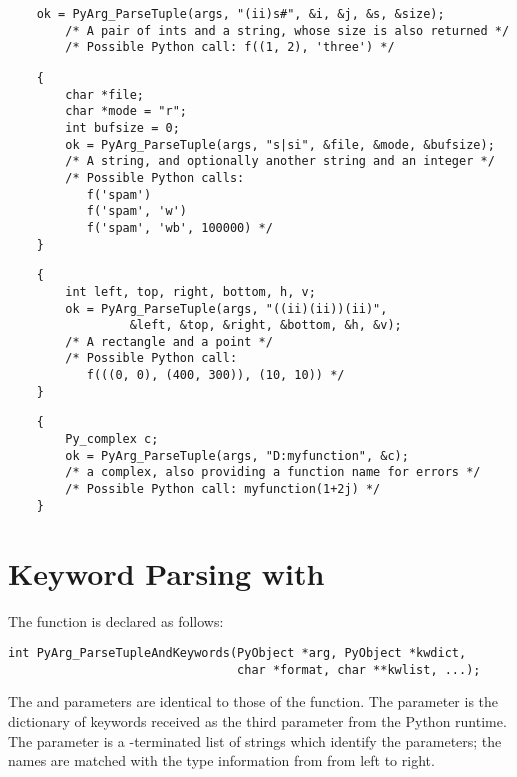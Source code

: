 \documentclass{manual}
\begin{document}
\begin{verbatim}
    ok = PyArg_ParseTuple(args, "(ii)s#", &i, &j, &s, &size);
        /* A pair of ints and a string, whose size is also returned */
        /* Possible Python call: f((1, 2), 'three') */
\end{verbatim}

\begin{verbatim}
    {
        char *file;
        char *mode = "r";
        int bufsize = 0;
        ok = PyArg_ParseTuple(args, "s|si", &file, &mode, &bufsize);
        /* A string, and optionally another string and an integer */
        /* Possible Python calls:
           f('spam')
           f('spam', 'w')
           f('spam', 'wb', 100000) */
    }
\end{verbatim}

\begin{verbatim}
    {
        int left, top, right, bottom, h, v;
        ok = PyArg_ParseTuple(args, "((ii)(ii))(ii)",
                 &left, &top, &right, &bottom, &h, &v);
        /* A rectangle and a point */
        /* Possible Python call:
           f(((0, 0), (400, 300)), (10, 10)) */
    }
\end{verbatim}

\begin{verbatim}
    {
        Py_complex c;
        ok = PyArg_ParseTuple(args, "D:myfunction", &c);
        /* a complex, also providing a function name for errors */
        /* Possible Python call: myfunction(1+2j) */
    }
\end{verbatim}


\section{Keyword Parsing with 
         \label{parseTupleAndKeywords}}

The  function is declared as
follows:

\begin{verbatim}
int PyArg_ParseTupleAndKeywords(PyObject *arg, PyObject *kwdict,
                                char *format, char **kwlist, ...);
\end{verbatim}

The  and  parameters are identical to those of the
 function.  The  parameter
is the dictionary of keywords received as the third parameter from the 
Python runtime.  The  parameter is a \NULL{}-terminated
list of strings which identify the parameters; the names are matched
with the type information from  from left to right.
\end{document}
